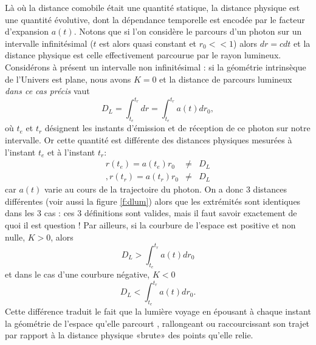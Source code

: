 Là où la distance comobile était une quantité statique, la distance physique est une quantité évolutive, dont la dépendance temporelle est encodée par le facteur d'expansion $a(t)$. Notons que si l'on considère le parcours d'un photon sur un intervalle infinitésimal ($t$ est alors quasi constant et $r_0<<1$) alors $dr=cdt$ et la distance physique est celle effectivement parcourue par le rayon lumineux. Considérons à présent un intervalle non infinitésimal : si la géométrie intrinsèque de l'Univers est plane, nous avons $K=0$ et la distance de parcours lumineux  \textit{dans ce cas précis} vaut 
\begin{equation}
D_L=\int_{t_e}^{t_r} dr=\int_{t_e}^{t_r}a(t)dr_0,
\end{equation}
où $t_e$ et $t_r$ désignent les instants d'émission et de réception de ce photon sur notre intervalle. Or cette quantité est différente des distances physiques mesurées à l'instant $t_e$ et à l'instant $t_r$:
\begin{eqnarray}
r(t_e)=a(t_e)r_0 &\ne & D_L\\,
r(t_r)=a(t_r)r_0  &\ne & D_L
\end{eqnarray}
car $a(t)$ varie au cours de la trajectoire du photon. On a donc 3 distances différentes (voir aussi la figure \ref{f:dlum}) alors que les extrémités sont identiques dans les 3 cas : ces 3 définitions sont valides, mais il faut savoir exactement de quoi il est question  ! Par ailleurs, si la courbure de l'espace est positive et non nulle, $K>0$, alors 
\begin{equation}
 D_L>\int_{t_e}^{t_r} a(t)dr_0
\end{equation}
et dans le cas d'une courbure négative, $K<0$
\begin{equation}
D_L<\int_{t_e}^{t_r} a(t)dr_0.
\end{equation}
Cette différence traduit le fait que la lumière voyage en épousant à chaque instant la géométrie de l'espace qu'elle parcourt , rallongeant ou raccourcissant son trajet par rapport à la distance physique «brute» des points qu'elle relie. 

